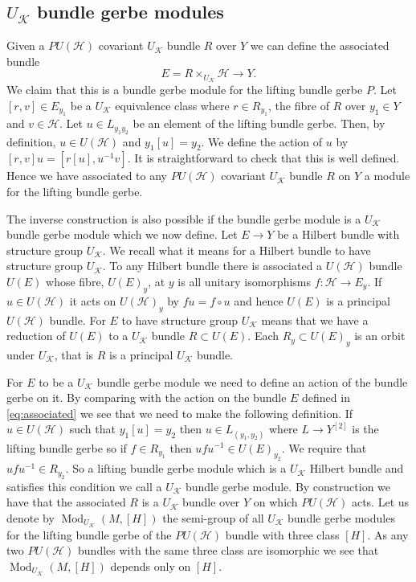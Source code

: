 \documentclass[a4paper,reqno]{amsart}
\DeclareMathOperator{\Mod}{Mod}
\theoremstyle{plain}
\theoremstyle{definition}
\theoremstyle{remark}
\numberwithin{equation}{section}
\numberwithin{figure}{section}
\newcommand{\cH}{{\mathcal H}}
\newcommand{\UK}{U{_\mathcal K}}
\newcommand{\<}{\langle}
\renewcommand{\>}{\rangle}
\begin{document}
\subsection{$\UK$ bundle gerbe modules}

Given a $PU(\cH)$ covariant $U{_\mathcal K}$ bundle $R$ over $Y$ we can
define the associated bundle
\begin{equation}
\label{eq:associated}
E = R \times_{U{_\mathcal K}} \cH \to Y.
\end{equation}
We claim that this is a bundle gerbe module for the
lifting bundle gerbe $P$.
Let $[r, v] \in E_{y_1}$ be a $U{_\mathcal K}$ equivalence class
where $r \in R_{y_1}$, the
fibre of $R$ over $y_1 \in Y$  and $v \in \cH$.
Let $u \in L_{y_1y_2}$ be an element of the lifting bundle
gerbe. Then, by definition, $u \in U(\cH)$ and $y_1[u] = y_2$.  We
define the action of $u$ by $[r, v]u = [r[u], u^{-1}v]$.  It is
straightforward to check that this is well defined.  Hence we have
associated to any $PU(\cH)$ covariant $U{_\mathcal K}$ bundle $R$ on $Y$
a module for the lifting bundle gerbe.

The inverse construction is also possible if the bundle gerbe
module is a $\UK$ bundle gerbe module which we now define.
Let $E\to Y$ be a  Hilbert bundle with structure
group $\UK$.  We recall what it means for a Hilbert bundle
to have structure group $\UK$.  To any Hilbert bundle  there is  associated a
$U(\cH)$ bundle
$U(E)$ whose fibre, $U(E)_y$, at $y$ is all unitary isomorphisms
$f \colon \cH \to E_y$. If
$u \in U(\cH)$ it acts on $U(\cH)_y$ by $fu = f \circ u$ and hence $U(E)$ is
a principal $U(\cH)$ bundle.  For $E$ to have structure
group $\UK$ means that we have a reduction of $U(E)$ to a $\UK$ bundle
$R \subset U(E)$.
Each  $R_y \subset U(E)_y$ is an orbit under $\UK$, that
is $R$ is a principal $\UK$ bundle.

For $E$ to be a $\UK$ bundle gerbe module we need to define
an action of the bundle gerbe on it.  By comparing with the action on the
bundle $E$ defined in \eqref{eq:associated} we see that we need to make the
following  definition.  If
$u \in U(\cH)$ such that $y_{1}[u] = y_{2}$  then $u \in L_{(y_1, y_2)}$
where $L \to Y^{[2]}$ is the lifting bundle gerbe so if $f \in R_{y_1}$ then
$ufu^{-1} \in U(E)_{y_2}$.  We require that $ufu^{-1} \in R_{y_2}$. So
a lifting bundle gerbe module which is a $\UK$ Hilbert bundle and
satisfies this condition we call a $\UK$ bundle gerbe module.  By
construction
we have that the associated $R$ is a $\UK$ bundle over $Y$ on which
$PU(\cH)$ acts.  Let us denote by $\Mod_{\UK}(M, [H])$
the semi-group of all $\UK$ bundle gerbe modules for the
lifting bundle gerbe of the $PU(\cH)$ bundle with three class $[H]$. As
any two $PU(\cH)$ bundles with the same three class are isomorphic we see
that $\Mod_{\UK}(M, [H])$ depends only on $[H]$.
\end{document}
